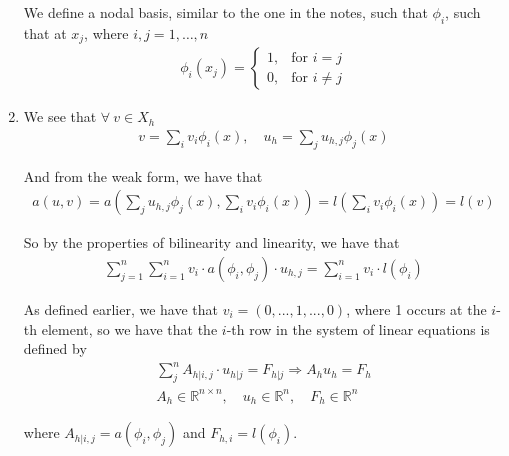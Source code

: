 \begin{enumerate}[label=(\alph*),leftmargin=*,itemsep=0mm]
    We define a nodal basis, similar to the one in the notes, such that $\phi_i$, such that at $x_j$, where $i,j = 1, \dots, n$
    \begin{align}
        \phi_i(x_j) = \begin{cases}
        1, & \text{for $i=j$} \\
        0, & \text{for $i\neq j$}
        \end{cases}
    \end{align}
    
    \item We see that $\forall\> v \in X_h$
    \begin{align}
        v = \sum_i v_i\phi_i(x),\quad
        u_h = \sum_j u_{h,j} \phi_j(x)
    \end{align}
    
    And from the weak form, we have that
    \begin{align}
        a(u,v) = a\left(\sum_j u_{h,j} \phi_j(x),\sum_i v_i\phi_i(x)\right)
        = l \left(\sum_i v_i\phi_i(x)\right) = l(v)
    \end{align}
    
    So by the properties of bilinearity and linearity, we have that
    \begin{align}
        \sum_{j=1}^n \sum_{i=1}^n v_i \cdot a(\phi_i,\phi_j) \cdot u_{h,j}
        = \sum_{i=1}^n v_i \cdot l(\phi_i)
    \end{align}
    
    As defined earlier, we have that $v_i = (0,...,1,...,0)$, where 1 occurs at the $i$-th element, so we have that the $i$-th row in the system of linear equations is defined by
    \begin{gather}
        \sum_j^n A_{h|i,j} \cdot u_{h|j} = F_{h|j} \Rightarrow A_h u_h = F_h \\
        A_h \in \mathbb{R}^{n\times n}, \quad
        u_h \in \mathbb{R}^{n}, \quad
        F_h \in \mathbb{R}^{n}
    \end{gather}
    
    where $A_{h|i,j} = a(\phi_i,\phi_j)$ and $F_{h,i} = l(\phi_i)$.
    

\end{enumerate}
